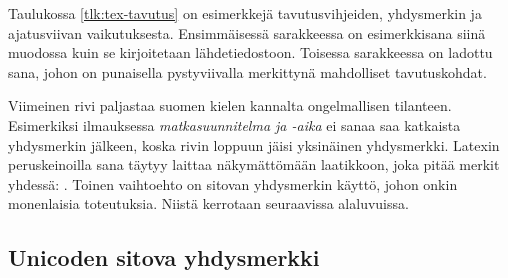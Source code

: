 
Taulukossa \ref{tlk:tex-tavutus} on esimerkkejä tavutusvihjeiden,
yhdysmerkin ja ajatusviivan vaikutuksesta. Ensimmäisessä sarakkeessa on
esimerkkisana siinä muodossa kuin se kirjoitetaan lähdetiedostoon.
Toisessa sarakkeessa on ladottu sana, johon on punaisella pystyviivalla
merkittynä mahdolliset tavutuskohdat.

Viimeinen rivi paljastaa suomen kielen kannalta ongelmallisen tilanteen.
Esimerkiksi ilmauksessa \emph{matkasuunnitelma ja \mbox{-aika}} ei sanaa
saa katkaista yhdysmerkin jälkeen, koska rivin loppuun jäisi yksinäinen
yhdysmerkki. Latexin peruskeinoilla sana täytyy laittaa näkymättömään
laatikkoon, joka pitää merkit yhdessä: .
Toinen vaihtoehto on sitovan yhdysmerkin käyttö, johon onkin monenlaisia
toteutuksia. Niistä kerrotaan seuraavissa alaluvuissa.

\subsection{Unicoden sitova yhdysmerkki}
\label{luku:unicode_sitova}

